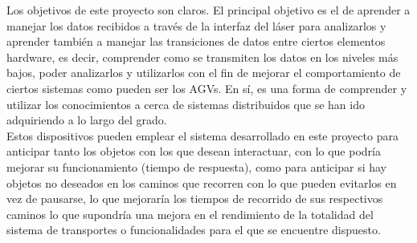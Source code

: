 
Los objetivos de este proyecto son claros. El principal objetivo es el de aprender a manejar los datos recibidos a través de la interfaz del láser para analizarlos y aprender también a manejar las transiciones de datos entre ciertos elementos hardware, es decir, comprender como se transmiten los datos en los niveles más bajos, poder analizarlos y utilizarlos con el fin de mejorar el comportamiento de ciertos sistemas como pueden ser los AGVs. En sí, es una forma de comprender y utilizar los conocimientos a cerca de sistemas distribuidos que se han ido adquiriendo a lo largo del grado.\\

Estos dispositivos pueden emplear el sistema desarrollado en este proyecto para anticipar tanto los objetos con los que desean interactuar, con lo que podría mejorar su funcionamiento (tiempo de respuesta), como para anticipar si hay objetos no deseados en los caminos que recorren con lo que pueden evitarlos en vez de pausarse, lo que mejoraría los tiempos de recorrido de sus respectivos caminos lo que supondría una mejora en el rendimiento de la totalidad del sistema de transportes o funcionalidades para el que se encuentre dispuesto.